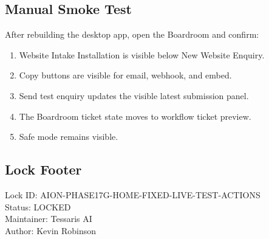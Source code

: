 \subsection{Manual Smoke Test}

After rebuilding the desktop app, open the Boardroom and confirm:

\begin{enumerate}
  \item Website Intake Installation is visible below New Website Enquiry.
  \item Copy buttons are visible for email, webhook, and embed.
  \item Send test enquiry updates the visible latest submission panel.
  \item The Boardroom ticket state moves to workflow ticket preview.
  \item Safe mode remains visible.
\end{enumerate}

\subsection{Lock Footer}

\noindent
Lock ID: AION-PHASE17G-HOME-FIXED-LIVE-TEST-ACTIONS \\
Status: LOCKED \\
Maintainer: Tessaris AI \\
Author: Kevin Robinson
